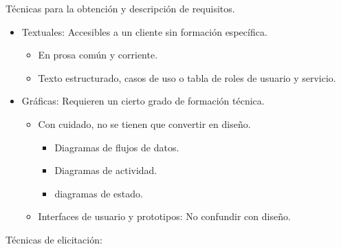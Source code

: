 \documentclass[12pt, twoside, openright]{report} %
\begin{document}
Técnicas para la obtención y descripción de requisitos.
\begin{itemize}
	\item Textuales: Accesibles a un cliente sin formación específica.
	      \begin{itemize}
		      \item En prosa común y corriente.
		      \item Texto estructurado, casos de uso o tabla de roles de usuario y
		            servicio.
	      \end{itemize}
	\item Gráficas: Requieren un cierto grado de formación técnica.
	      \begin{itemize}
		      \item Con cuidado, no se tienen que convertir en diseño.
		            \begin{itemize}
			            \item Diagramas de flujos de datos.
			            \item Diagramas de actividad.
			            \item diagramas de estado.
		            \end{itemize}
		      \item Interfaces de usuario y prototipos: No confundir con diseño.
	      \end{itemize}
\end{itemize}


Técnicas de elicitación:
\end{document}
